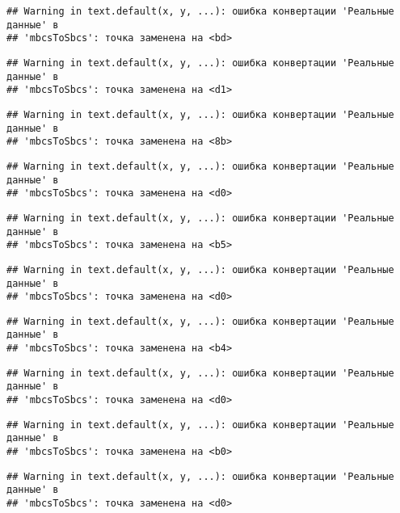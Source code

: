\documentclass[
]{article}
\begin{document}
\begin{verbatim}
## Warning in text.default(x, y, ...): ошибка конвертации 'Реальные данные' в
## 'mbcsToSbcs': точка заменена на <bd>
\end{verbatim}

\begin{verbatim}
## Warning in text.default(x, y, ...): ошибка конвертации 'Реальные данные' в
## 'mbcsToSbcs': точка заменена на <d1>
\end{verbatim}

\begin{verbatim}
## Warning in text.default(x, y, ...): ошибка конвертации 'Реальные данные' в
## 'mbcsToSbcs': точка заменена на <8b>
\end{verbatim}

\begin{verbatim}
## Warning in text.default(x, y, ...): ошибка конвертации 'Реальные данные' в
## 'mbcsToSbcs': точка заменена на <d0>
\end{verbatim}

\begin{verbatim}
## Warning in text.default(x, y, ...): ошибка конвертации 'Реальные данные' в
## 'mbcsToSbcs': точка заменена на <b5>
\end{verbatim}

\begin{verbatim}
## Warning in text.default(x, y, ...): ошибка конвертации 'Реальные данные' в
## 'mbcsToSbcs': точка заменена на <d0>
\end{verbatim}

\begin{verbatim}
## Warning in text.default(x, y, ...): ошибка конвертации 'Реальные данные' в
## 'mbcsToSbcs': точка заменена на <b4>
\end{verbatim}

\begin{verbatim}
## Warning in text.default(x, y, ...): ошибка конвертации 'Реальные данные' в
## 'mbcsToSbcs': точка заменена на <d0>
\end{verbatim}

\begin{verbatim}
## Warning in text.default(x, y, ...): ошибка конвертации 'Реальные данные' в
## 'mbcsToSbcs': точка заменена на <b0>
\end{verbatim}

\begin{verbatim}
## Warning in text.default(x, y, ...): ошибка конвертации 'Реальные данные' в
## 'mbcsToSbcs': точка заменена на <d0>
\end{verbatim}
\end{document}
